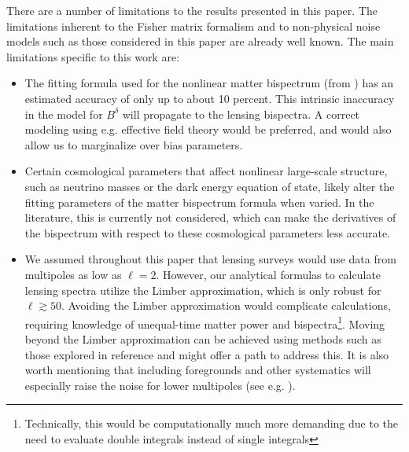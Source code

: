 \documentclass[11pt]{article} %
\begin{document}
There are a number of limitations to the results presented in this paper. The limitations inherent to the Fisher matrix formalism and to non-physical noise models such as those considered in this paper are already well known. The main limitations specific to this work are:
\begin{itemize}
     \item The fitting formula used for the nonlinear matter bispectrum (from \cite{bispfit}) has an estimated accuracy of only up to about 10 percent. This intrinsic inaccuracy in the model for $B^{\delta}$ will propagate to the lensing bispectra. A correct modeling using e.g. effective field theory would be preferred, and would also allow us to marginalize over bias parameters. 
     
     \item Certain cosmological parameters that affect nonlinear large-scale structure, such as neutrino masses or the dark energy equation of state, likely alter the fitting parameters of the matter bispectrum formula when varied. In the literature, this is currently not considered, which can make the derivatives of the bispectrum with respect to these cosmological parameters less accurate.
     
     \item We assumed throughout this paper that lensing surveys would use data from multipoles as low as $\ell = 2$.  However, our analytical formulas to calculate lensing spectra utilize the Limber approximation, which is only robust for $\ell \gtrsim 50$. Avoiding the Limber approximation would complicate calculations, requiring knowledge of unequal-time matter power and bispectra\footnote{Technically, this would be computationally much more demanding due to the need to evaluate double integrals instead of single integrals}. Moving beyond the Limber approximation can be achieved using methods such as those explored in reference \cite{Chen:2021vba} and might offer a path to address this. It is also worth mentioning that including foregrounds and other systematics will especially raise the noise for lower multipoles (see e.g. \cite{de_Oliveira_Costa_2006}).


\end{itemize}
\end{document}
